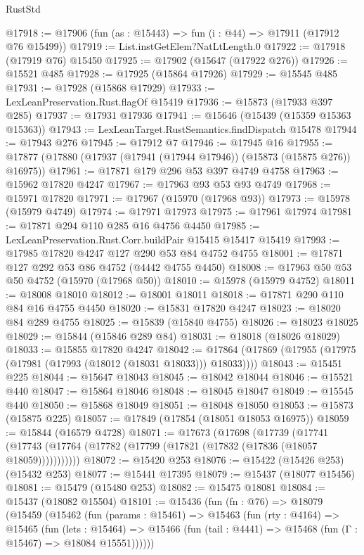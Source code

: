 \begin{lexlean}{RustStd}
\begin{coremodule}
@17918 := @17906 (fun (as : @15443) => fun (i : @44) => @17911 (@17912 @76 @15499))
@17919 := List.instGetElem?NatLtLength.{0}
@17922 := @17918 (@17919 @76) @15450
@17925 := @17902 (@15647 (@17922 @276))
@17926 := @15521 @485
@17928 := @17925 (@15864 @17926)
@17929 := @15545 @485
@17931 := @17928 (@15868 @17929)
@17933 := LexLeanPreservation.Rust.flagOf @15419
@17936 := @15873 (@17933 @397 @285)
@17937 := @17931 @17936
@17941 := @15646 (@15439 (@15359 @15363 @15363))
@17943 := LexLeanTarget.RustSemantics.findDispatch @15478
@17944 := @17943 @276
@17945 := @17912 @7
@17946 := @17945 @16
@17955 := @17877 (@17880 (@17937 (@17941 (@17944 @17946)) (@15873 (@15875 @276)) @16975))
@17961 := @17871 @179 @296 @53 @397 @4749 @4758
@17963 := @15962 @17820 @4247
@17967 := @17963 @93 @53 @93 @4749
@17968 := @15971 @17820
@17971 := @17967 (@15970 (@17968 @93))
@17973 := @15978 (@15979 @4749)
@17974 := @17971 @17973
@17975 := @17961 @17974
@17981 := @17871 @294 @110 @285 @16 @4756 @4450
@17985 := LexLeanPreservation.Rust.Corr.buildPair @15415 @15417 @15419
@17993 := @17985 @17820 @4247 @127 @290 @53 @84 @4752 @4755
@18001 := @17871 @127 @292 @53 @86 @4752 (@4442 @4755 @4450)
@18008 := @17963 @50 @53 @50 @4752 (@15970 (@17968 @50))
@18010 := @15978 (@15979 @4752)
@18011 := @18008 @18010
@18012 := @18001 @18011
@18018 := @17871 @290 @110 @84 @16 @4755 @4450
@18020 := @15831 @17820 @4247
@18023 := @18020 @84 @289 @4755
@18025 := @15839 (@15840 @4755)
@18026 := @18023 @18025
@18029 := @15844 (@15846 @289 @84)
@18031 := @18018 (@18026 @18029)
@18033 := @15855 @17820 @4247
@18042 := @17864 (@17869 (@17955 (@17975 (@17981 (@17993 (@18012 (@18031 @18033))) @18033))))
@18043 := @15451 @225
@18044 := @15647 @18043
@18045 := @18042 @18044
@18046 := @15521 @440
@18047 := @15864 @18046
@18048 := @18045 @18047
@18049 := @15545 @440
@18050 := @15868 @18049
@18051 := @18048 @18050
@18053 := @15873 (@15875 @225)
@18057 := @17849 (@17854 (@18051 @18053 @16975))
@18059 := @15844 (@16579 @4728)
@18071 := @17673
    (@17698
      (@17739
        (@17741 (@17743 (@17764 (@17782 (@17799 (@17821 (@17832 (@17836 (@18057 @18059)))))))))))
@18072 := @15420 @253
@18076 := @15422 (@15426 @253) (@15432 @253)
@18077 := @15441 @17395
@18079 := @15437 (@18077 @15456)
@18081 := @15479 (@15480 @253)
@18082 := @15475 @18081
@18084 := @15437 (@18082 @15504)
@18101 := @15436
    (fun (fn : @76) =>
    @18079
      (@15459
        (@15462
          (fun (params : @15461) =>
          @15463
            (fun (rty : @4164) =>
            @15465
              (fun (lets : @15464) =>
              @15466 (fun (tail : @4441) => @15468 (fun (Γ : @15467) => @18084 @15551))))))

\end{coremodule}
\end{lexlean}
